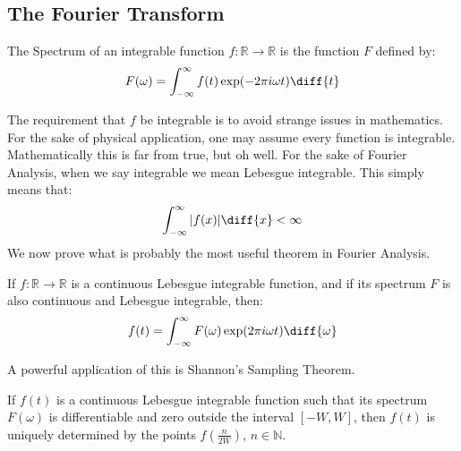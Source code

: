 \documentclass[crop=false,class=book,oneside]{standalone}
\begin{document}
        \subsection{The Fourier Transform}
            \begin{definition}
                The Spectrum of an integrable function
                $f:\mathbb{R}\rightarrow\mathbb{R}$ is the
                function $F$ defined by:
                \begin{equation}
                    F(\omega)=
                    \int_{-\infty}^{\infty}f(t)
                    \exp(-2\pi{i}\omega{t})\diff{t}
                \end{equation}
            \end{definition}
            The requirement that $f$ be integrable is to avoid
            strange issues in mathematics. For the sake of
            physical application, one may assume every function
            is integrable. Mathematically this is far from true,
            but oh well. For the sake of Fourier Analysis, when
            we say integrable we mean Lebesgue integrable. This
            simply means that:
            \begin{equation}
                \int_{-\infty}^{\infty}|f(x)|\diff{x}<\infty
            \end{equation}
            We now prove what is probably the most useful theorem
            in Fourier Analysis.
            \begin{theorem}
                If $f:\mathbb{R}\rightarrow\mathbb{R}$ is a
                continuous Lebesgue integrable function,
                and if its spectrum $F$ is also continuous
                and Lebesgue integrable, then:
                \begin{equation}
                    f(t)=\int_{-\infty}^{\infty}F(\omega)
                    \exp(2\pi{i}\omega{t})\diff{\omega}
                \end{equation}
            \end{theorem}
            A powerful application of this is
            Shannon's Sampling Theorem.
            \begin{theorem}
                If $f(t)$ is a continuous
                Lebesgue integrable function such that
                its spectrum $F(\omega)$ is differentiable and zero
                outside the interval $[-W,W]$,
                then $f(t)$ is uniquely determined
                by the points $f(\frac{n}{2W})$, $n\in\mathbb{N}$.
            \end{theorem}
\end{document}
